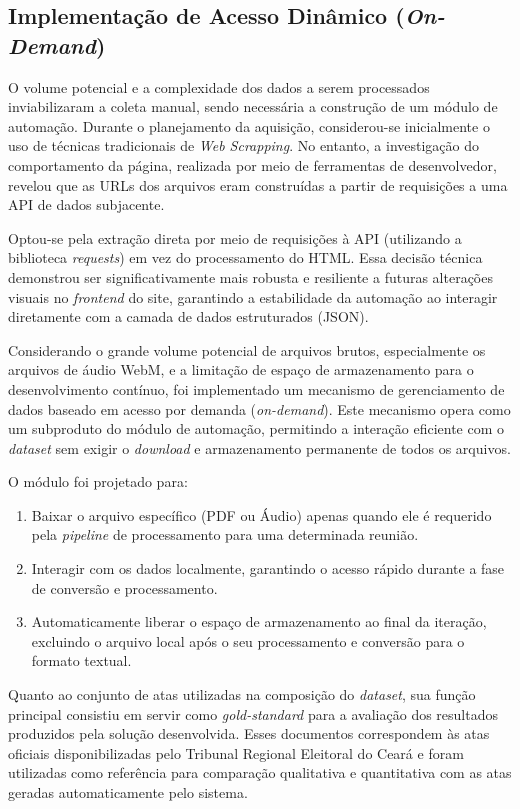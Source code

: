 \subsection{Implementação de Acesso Dinâmico (\textit{On-Demand})}
\label{sec:discussao-coleta}

O volume potencial e a complexidade dos dados a serem processados inviabilizaram a coleta manual, sendo necessária a construção de um módulo de automação. Durante o planejamento da aquisição, considerou-se inicialmente o uso de técnicas tradicionais de \textit{Web Scrapping}. No entanto, a investigação do comportamento da página, realizada por meio de ferramentas de desenvolvedor, revelou que as URLs dos arquivos eram construídas a partir de requisições a uma API de dados subjacente.

Optou-se pela extração direta por meio de requisições à API (utilizando a biblioteca \textit{requests}) em vez do processamento do HTML. Essa decisão técnica demonstrou ser significativamente mais robusta e resiliente a futuras alterações visuais no \textit{frontend} do site, garantindo a estabilidade da automação ao interagir diretamente com a camada de dados estruturados (JSON).

Considerando o grande volume potencial de arquivos brutos, especialmente os arquivos de áudio WebM, e a limitação de espaço de armazenamento para o desenvolvimento contínuo, foi implementado um mecanismo de gerenciamento de dados baseado em acesso por demanda (\textit{on-demand}). Este mecanismo opera como um subproduto do módulo de automação, permitindo a interação eficiente com o \textit{dataset} sem exigir o \textit{download} e armazenamento permanente de todos os arquivos.

O módulo foi projetado para:
\begin{enumerate}
    \item Baixar o arquivo específico (PDF ou Áudio) apenas quando ele é requerido pela \textit{pipeline} de processamento para uma determinada reunião.
    \item Interagir com os dados localmente, garantindo o acesso rápido durante a fase de conversão e processamento.
    \item Automaticamente liberar o espaço de armazenamento ao final da iteração, excluindo o arquivo local após o seu processamento e conversão para o formato textual.
\end{enumerate}

Quanto ao conjunto de atas utilizadas na composição do \textit{dataset}, sua função principal consistiu em servir como \textit{gold-standard} para a avaliação dos resultados produzidos pela solução desenvolvida. Esses documentos correspondem às atas oficiais disponibilizadas pelo Tribunal Regional Eleitoral do Ceará e foram utilizadas como referência para comparação qualitativa e quantitativa com as atas geradas automaticamente pelo sistema.

